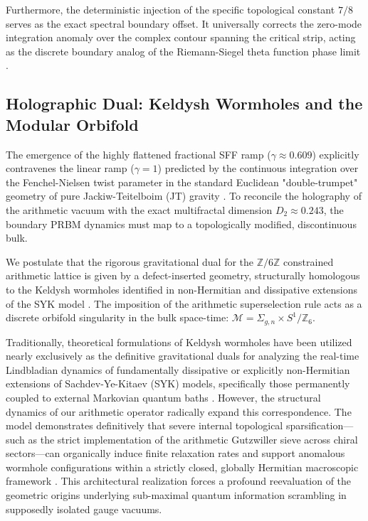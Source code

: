 \documentclass[aps,prl,preprint,superscriptaddress,floatfix]{revtex4-2}
\newcommand{\Zmod}{\mathbb{Z}/6\mathbb{Z}}
\begin{document}
Furthermore, the deterministic injection of the specific topological constant $7/8$ serves as the exact spectral boundary offset. It universally corrects the zero-mode integration anomaly over the complex contour spanning the critical strip, acting as the discrete boundary analog of the Riemann-Siegel theta function phase limit \cite{Corless1996, Borwein2008}.

\subsection{Holographic Dual: Keldysh Wormholes and the Modular Orbifold}

The emergence of the highly flattened fractional SFF ramp ($\gamma \approx 0.609$) explicitly contravenes the linear ramp ($\gamma = 1$) predicted by the continuous integration over the Fenchel-Nielsen twist parameter in the standard Euclidean "double-trumpet" geometry of pure Jackiw-Teitelboim (JT) gravity \cite{Saad2019, Cotler2017}. To reconcile the holography of the arithmetic vacuum with the exact multifractal dimension $D_2 \approx 0.243$, the boundary PRBM dynamics must map to a topologically modified, discontinuous bulk.

We postulate that the rigorous gravitational dual for the $\Zmod$ constrained arithmetic lattice is given by a defect-inserted geometry, structurally homologous to the Keldysh wormholes identified in non-Hermitian and dissipative extensions of the SYK model \cite{Zheng2023b, GarciaGarcia2023, Arias2024}. The imposition of the arithmetic superselection rule acts as a discrete orbifold singularity in the bulk space-time: $\mathcal{M} = \Sigma_{g,n} \times S^1 / \mathbb{Z}_6$.

Traditionally, theoretical formulations of Keldysh wormholes have been utilized nearly exclusively as the definitive gravitational duals for analyzing the real-time Lindbladian dynamics of fundamentally dissipative or explicitly non-Hermitian extensions of Sachdev-Ye-Kitaev (SYK) models, specifically those permanently coupled to external Markovian quantum baths \cite{GarciaGarcia2023, Zheng2023b}. However, the structural dynamics of our arithmetic operator radically expand this correspondence. The model demonstrates definitively that severe internal topological sparsification—such as the strict implementation of the arithmetic Gutzwiller sieve across chiral sectors—can organically induce finite relaxation rates and support anomalous wormhole configurations within a strictly closed, globally Hermitian macroscopic framework \cite{Bhattacharjee2025}. This architectural realization forces a profound reevaluation of the geometric origins underlying sub-maximal quantum information scrambling in supposedly isolated gauge vacuums.
\end{document}
